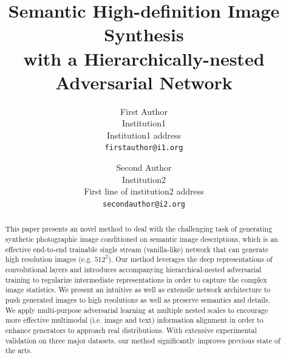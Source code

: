 \documentclass[10pt,twocolumn,letterpaper]{article}
\begin{document}
\title{Semantic High-definition Image Synthesis \\ with a Hierarchically-nested Adversarial Network}

\author{First Author\\
Institution1\\
Institution1 address\\
{\tt\small firstauthor@i1.org}
\and
Second Author\\
Institution2\\
First line of institution2 address\\
{\tt\small secondauthor@i2.org}
}

\maketitle

\begin{abstract}
This paper presents an novel method to deal with the challenging task of generating synthetic photographic image conditioned on semantic image descriptions, which is an effective end-to-end trainable single stream (vanilla-like) network that can generate high resolution images (e.g. $512^2$). Our method leverages the deep representations of convolutional layers and introduces accompanying hierarchical-nested adversarial training to regularize intermediate representations in order to capture the complex image statistics. We present an intuitive as well as extensile network architecture to push generated images to high resolutions as well as preserve semantics and details. 
We apply multi-purpose adversarial learning at multiple nested scales to encourage more effective multimodal (i.e. image and text) information alignment in order to enhance generators to approach real distributions. 
With extensive experimental validation on three major datasets, our method significantly improves previous state of the arts. 

\end{abstract}


\end{document}
